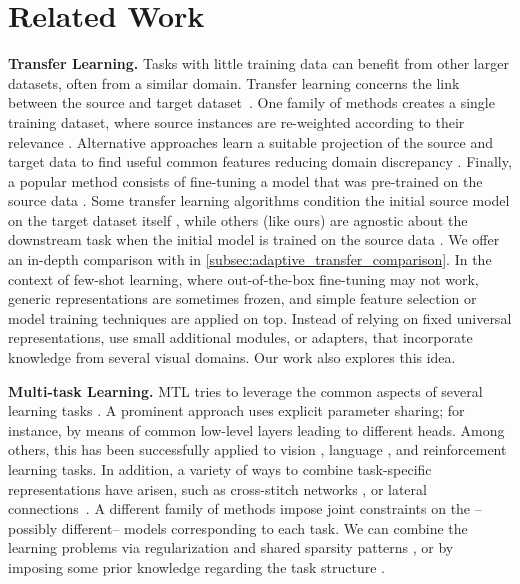 \documentclass{article}
\begin{document}
 \section{Related Work}
\label{sec:literature}
\textbf{Transfer Learning.}
Tasks with little training data can benefit from other larger datasets, often from a similar domain.
Transfer learning concerns the link between the source and target dataset~\cite{pan2009survey, weiss2016survey, tan2018survey, wang2018theoretical}.
One family of methods creates a single training dataset, where source instances are 
re-weighted according to their relevance
\cite{dai2007boosting, pardoe2010boosting, wan2011bi, xu2017unified}. 
Alternative approaches learn 
a suitable projection of the source and target data to find useful common features 
reducing domain discrepancy 
\cite{long2015learning, long2017deep, pan2010domain, tzeng2014deep, yosinski2014transferable}. 
Finally, a popular method consists of fine-tuning a model that was 
pre-trained on the source data \cite{donahue2014decaf, oquab2014learning, sharif2014cnn}.
Some transfer learning algorithms condition the initial source
model on the target dataset itself \cite{ngiam2018domain,xie2019self,yalniz2019billion}, while
others (like ours) are agnostic about the downstream task when
the initial model is trained on the source data 
\cite{kolesnikov2019large}. We offer an in-depth comparison with
\cite{ngiam2018domain} in \cref{subsec:adaptive_transfer_comparison}.
In the context of few-shot learning, where out-of-the-box fine-tuning may not work, 
generic representations are sometimes frozen, and simple feature selection 
\cite{dvornik2020selecting} or model training \cite{chen2019closer} techniques
are applied on top.
Instead of relying on fixed universal representations, 
\cite{rebuffi2017learning, rebuffi2018efficient, rosenfeld2018incremental} 
use small additional modules, or adapters, that incorporate knowledge from several visual domains. Our work also explores this idea.

\textbf{Multi-task Learning.} MTL tries to leverage the common aspects of several learning tasks \cite{caruana1997multitask}.
A prominent approach uses explicit parameter sharing; for instance, by means of common low-level layers leading to different heads. Among others, this has been successfully applied to vision \cite{zhang2014facial}, language \cite{liu2015representation}, and reinforcement learning \cite{fedus2019hyperbolic} tasks.
In addition, a variety of ways to combine task-specific representations have arisen, such as cross-stitch networks \cite{misra2016cross}, or lateral connections~\cite{rusu2016progressive}. 
A different family of methods impose joint constraints on the --possibly different-- models corresponding to each task.
We can combine the learning problems
via regularization and shared sparsity patterns \cite{argyriou2007multi, lounici2009taking}, or by imposing some prior knowledge regarding the task structure \cite{evgeniou2005learning, jacob2009clustered, kim2012tree}. 
\end{document}

